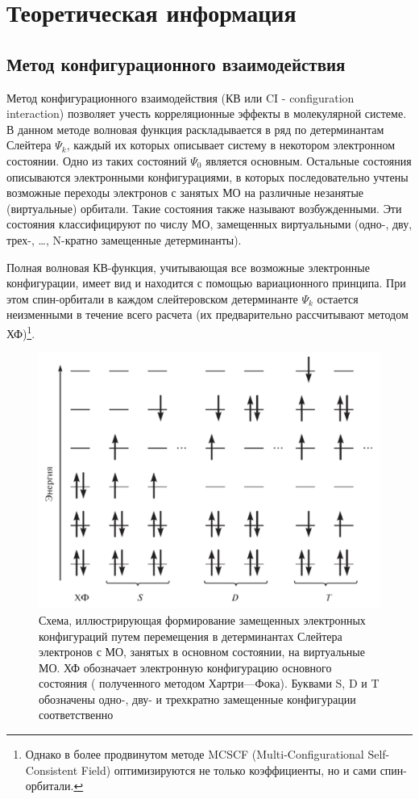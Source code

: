 \section{Теоретическая информация}
\subsection{Метод конфигурационного взаимодействия}
Метод конфигурационного взаимодействия (КВ или CI - configuration interaction) позволяет учесть корреляционные эффекты в молекулярной системе. В данном методе волновая функция раскладывается в ряд по детерминантам Слейтера $\Psi_k$, каждый их которых описывает систему в некотором электронном состоянии. Одно из таких состояний $\Psi_0$ является основным. Остальные состояния описываются электронными конфигурациями, в которых последовательно учтены возможные переходы электронов с занятых МО на различные незанятые (виртуальные) орбитали. Такие состояния также называют возбужденными. Эти состояния классифицируют по числу МО, замещенных виртуальными (одно-, дву, трех-, \ldots, N-кратно замещенные детерминанты). 

Полная волновая КВ-функция, учитывающая все возможные электронные конфигурации, имеет вид
и находится с помощью вариационного принципа. При этом спин-орбитали в каждом слейтеровском детерминанте $\Psi_k$ остается неизменными в течение всего расчета (их предварительно рассчитывают методом ХФ)\footnote{Однако в более продвинутом методе MCSCF (Multi-Configurational Self-Consistent Field) оптимизируются не только коэффициенты, но и сами спин-орбитали.}.

\begin{figure}[H]
\centering
\captionsetup{justification=centering}
\includegraphics[scale=0.5]{fig/2.png}
\caption{Схема, иллюстрирующая формирование замещенных электронных конфигураций путем перемещения в детерминантах Слейтера электронов с МО, занятых в основном состоянии, на виртуальные МО. ХФ обозначает электронную конфигурацию основного состояния ( полученного методом Хартри—Фока). Буквами S, D и T обозначены одно-, дву- и трехкратно замещенные конфигурации соответственно}
\end{figure}
